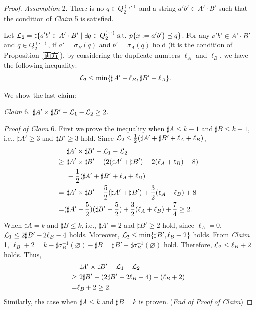 \begin{proof}
\smallskip

\noindent
\textit{Assumption} 2.
There is no $q \in Q_{2}^{(\cdot,\cdot)}$ and a string $a'b' \in A'\cdot B'$ such that the condition of \textit{Claim} 5 is satisfied.

\smallskip

\noindent
Let ${\cal L}_{2} = \sharp\{a'b' \in A'\cdot B' \mid \exists q \in Q_{2}^{(\cdot,\cdot)} \mbox{ s.t. } p\{x:=a'b'\} \preceq q\}$.
For any $a'b' \in A'\cdot B'$ and $q \in Q_{2}^{(\cdot,\cdot)}$, if $a' = \sigma_{B}(q)$ and $b' = \sigma_{A}(q)$ hold (it is the condition of Proposition~\ref{両方}), by considering the duplicate numbers $\ell_{A}$ and $\ell_{B}$, we have the following inequality:
\begin{align*}
  {\cal L}_{2} &\leq \min\{\sharp A' + \ell_{B}, \sharp B' + \ell_{A}\}.
\end{align*}

We show the last claim:
  
\smallskip

\noindent
\textit{Claim} 6. 
$\sharp A' \times \sharp B' - {\cal L}_{1} - {\cal L}_{2} \geq 2$.

\smallskip

\noindent
\textit{Proof of Claim} 6. 
First we prove the inequality when $\sharp A \leq k - 1$ and $\sharp B \leq k - 1$, i.e., $\sharp A' \geq 3$ and $\sharp B' \geq 3$ hold.
Since ${\cal L}_{2} \leq \frac{1}{2}(\sharp A' + \sharp B' + \ell_{A} + \ell_{B})$,
\begin{align*}
  &\ \sharp A' \times \sharp B' - {\cal L}_{1} - {\cal L}_{2}\\
\geq &\ \sharp A' \times \sharp B' - (2(\sharp A' + \sharp B') - 2(\ell_{A} + \ell_{B}) - 8)\\
  &\ - \frac{1}{2}(\sharp A' + \sharp B' + \ell_{A} + \ell_{B})\\
=    &\ \sharp A' \times \sharp B' - \frac{5}{2}(\sharp A' + \sharp B') + \frac{3}{2}(\ell_{A} + \ell_{B}) + 8\\
=    &(\sharp A' - \frac{5}{2})(\sharp B' - \frac{5}{2}) + \frac{3}{2}(\ell_{A} + \ell_{B}) + \frac{7}{4} \geq 2.
\end{align*}
When $\sharp A = k$ and $\sharp B \leq k$, i.e., $\sharp A' = 2$ and $\sharp B' \geq 2$ hold, since $\ell_{A} = 0$,
${\cal L}_{1} \leq 2\sharp B' - 2\ell_{B} -4$ holds.
Moreover, ${\cal L}_{2} \leq \min\{\sharp B', \ell_{B} + 2\}$ holds.
From \textit{Claim} 1, $\ell_B + 2 = k - \sharp\sigma^{-1}_{B}(\varnothing) - \sharp B = \sharp B' - \sharp\sigma^{-1}_{B}(\varnothing)$ hold. Therefore, ${\cal L}_{2} \leq \ell_{B} + 2$ holds.
Thus,
\begin{align*}
  &\ \sharp A' \times \sharp B' - {\cal L}_{1} - {\cal L}_{2}\\
\geq &\ 2\sharp B' - (2\sharp B' - 2\ell_{B} -4) - (\ell_{B} + 2)\\
= & \ell_B + 2 \geq 2.
\end{align*}
Similarly, the case when $\sharp A \leq k$ and $\sharp B = k$ is proven.
(\textit{End of Proof of Claim})


\end{proof}
